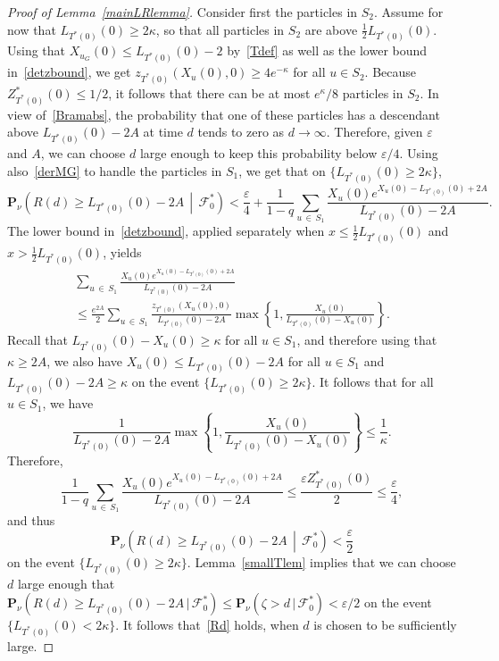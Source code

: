 \documentclass[AHL,Unicode,longabstracts,published]{cedram}
\newcommand*\eps{\varepsilon}
\renewcommand*\P{\mathbf{P}}
\newcommand\F{\mathcal{F}}
\newcommand{\1} {\mathds{1}}
\begin{document}
\begin{proof}[Proof of Lemma~\ref{mainLRlemma}]
Consider first the particles in $S_2$. Assume for now that $L_{T^*(0)}(0) \geq 2 \kappa$, so that all particles in $S_2$ are above $\frac{1}{2} L_{T^*(0)}(0)$. Using that $X_{u_G}(0) \leq L_{T^*(0)}(0) - 2$ by~\eqref{Tdef} as well as the lower bound in~\eqref{detzbound}, we get $z_{T^*(0)}(X_u(0), 0) \geq 4 e^{-\kappa}$ for all $u \in S_2$. Because $Z^*_{T^*(0)}(0) \leq 1/2$, it follows that there can be at most $e^{\kappa}/8$ particles in $S_2$. In view of~\eqref{Bramabs}, the probability that one of these particles has a descendant above $L_{T^*(0)}(0) - 2A$ at time $d$ tends to zero as $d \rightarrow \infty$. Therefore, given $\eps$ and $A$, we can choose $d$ large enough to keep this probability below $\eps/4$. Using also~\eqref{derMG} to handle the particles in $S_1$, we get that on $\{L_{T^*(0)}(0) \geq 2 \kappa\}$,
\[
\P_{\nu}\left(R(d) \geq L_{T^*(0)}(0) - 2A\,\middle|\,\F^*_0\right) < \frac{\eps}{4} + \frac{1}{1-q} \sum_{u\,\in\,S_1} \frac{X_u(0) e^{X_u(0) - L_{T^*(0)}(0) + 2A}}{L_{T^*(0)}(0) - 2A}.
\]
The lower bound in~\eqref{detzbound}, applied separately when $x \leq \frac{1}{2} L_{T^*(0)}(0)$ and $x > \frac{1}{2}L_{T^*(0)}(0)$, yields
\begin{multline*}
\sum_{u\,\in\,S_1} \frac{X_u(0) e^{X_u(0) - L_{T^*(0)}(0) + 2A}}{L_{T^*(0)}(0) - 2A} \\
\leq \frac{e^{2A}}{2} \sum_{u\,\in\,S_1} \frac{z_{T^*(0)}(X_u(0), 0)}{L_{T^*(0)}(0) - 2A} \max \left\{1, \frac{X_u(0)}{L_{T^*(0)}(0) - X_u(0)} \right\}.
\end{multline*}
Recall that $L_{T^*(0)}(0) - X_u(0) \geq \kappa$ for all $u \in S_1$, and therefore using that $\kappa \geq 2A$, we also have $X_u(0) \leq L_{T^*(0)}(0) - 2A$ for all $u \in S_1$ and $L_{T^*(0)}(0) - 2A \geq \kappa$ on the event $\{L_{T^*(0)}(0) \geq 2 \kappa\}$. It follows that for all $u \in S_1$, we have
\[
\frac{1}{L_{T^*(0)}(0) - 2A} \max \left\{1, \frac{X_u(0)}{L_{T^*(0)}(0) - X_u(0)} \right\} \leq \frac{1}{\kappa}.
\]
Therefore,
\[
\frac{1}{1-q} \sum_{u\,\in\,S_1} \frac{X_u(0) e^{X_u(0) - L_{T^*(0)}(0) + 2A}}{L_{T^*(0)}(0) - 2A} \leq \frac{\eps Z^*_{T^*(0)}(0)}{2} \leq \frac{\eps}{4},
\]
and thus
\[
\P_{\nu}\left(R(d) \geq L_{T^*(0)}(0) - 2A\,\middle|\, \F^*_0\right) < \frac{\eps}{2}
\]
on the event $\{L_{T^*(0)}(0) \geq 2 \kappa\}$. Lemma~\ref{smallTlem} implies that we can choose $d$ large enough that $\P_{\nu}(R(d) \geq L_{T^*(0)}(0) - 2A\,|\, \F^*_0) \leq \P_{\nu}(\zeta > d\,|\,\F_0^*) < \eps/2$ on the event $\{L_{T^*(0)}(0) < 2 \kappa\}$. It follows that~\eqref{Rd} holds, when $d$ is chosen to be sufficiently large.


\end{proof}
\end{document}
